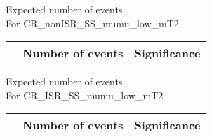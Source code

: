 \begin{frame}{Expected number of events \\ For CR\_nonISR\_SS\_mumu\_low\_mT2}
\vspace{5mm}
\begin{tabular}{|c|c|c|}
\hline
& Number of events & Significance \\
\hline

\end{tabular}
\end{frame}

\begin{frame}{Expected number of events \\ For CR\_ISR\_SS\_mumu\_low\_mT2}
\vspace{5mm}
\begin{tabular}{|c|c|c|}
\hline
& Number of events & Significance \\
\hline

\end{tabular}
\end{frame}

